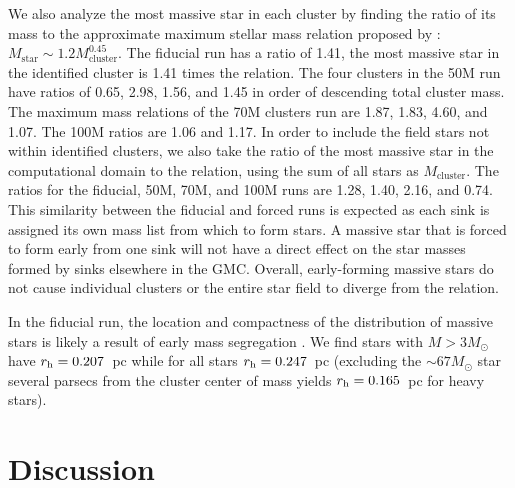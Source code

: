 \documentclass[twoside]{drexel-thesis}
\begin{document}
\begin{thesis}
We also analyze the most massive star in each cluster by finding the ratio of its mass to the approximate maximum stellar mass relation proposed by \citet{larson_stellar_2003}: $M_{\text{star}}\sim1.2M_{\text{cluster}}^{0.45}$. The fiducial run has a ratio of 1.41, the most massive star in the identified cluster is 1.41 times the \citet{larson_stellar_2003} relation. The four clusters in the 50M run have ratios of 0.65, 2.98, 1.56, and 1.45 in order of descending total cluster mass. The maximum mass relations of the 70M clusters run are 1.87, 1.83, 4.60, and 1.07. The 100M ratios are 1.06 and 1.17. In order to include the field stars not within identified clusters, we also take the ratio of the most massive star in the computational domain to the \citet{larson_stellar_2003} relation, using the sum of all stars as $M_{\text{cluster}}$. The ratios for the fiducial, 50M, 70M, and 100M runs are 1.28, 1.40, 2.16, and 0.74. This similarity between the fiducial and forced runs is expected as each sink is assigned its own mass list from which to form stars. A massive star that is forced to form early from one sink will not have a direct effect on the star masses formed by sinks elsewhere in the GMC. Overall, early-forming massive stars do not cause individual clusters or the entire star field to diverge from the \citet{larson_stellar_2003} relation.

In the fiducial run, the location and compactness of the distribution of massive stars is likely a result of early mass segregation \citep{binney_galactic_1987, mcmillan_dynamical_2007}. We find stars with $M >3M_\odot$ have $r_{\rm h} = 0.207$~pc while  for all stars $r_{\rm h} =0.247$~pc (excluding the $\sim67 M_\odot$ star several parsecs from the cluster center of mass yields $r_{\rm h} = 0.165$~pc for heavy stars). 

\section{Discussion}\label{sec:p1-discussion}

\end{thesis}
\end{document}
